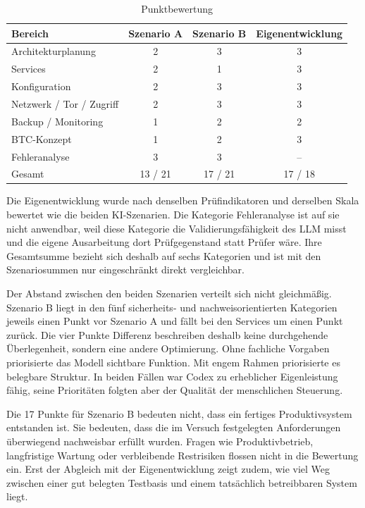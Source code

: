 {\begin{table}[h]
\centering
\begin{tabular}{lccc}
\hline
Bereich & Szenario A & Szenario B & Eigenentwicklung \\
\hline
Architekturplanung & 2 & 3 & 3 \\
Services & 2 & 1 & 3 \\
Konfiguration & 2 & 3 & 3 \\
Netzwerk / Tor / Zugriff & 2 & 3 & 3 \\
Backup / Monitoring & 1 & 2 & 2 \\
\ac{BTC}-Konzept & 1 & 2 & 3 \\
Fehleranalyse & 3 & 3 & -- \\
\hline
Gesamt & 13 / 21 & 17 / 21 & 17 / 18 \\
\hline
\end{tabular}
\caption{Punktbewertung}
\label{tab:ki-evaluation-szenarien}
\end{table}


Die Eigenentwicklung wurde nach denselben Prüfindikatoren und derselben Skala bewertet wie die beiden \ac{KI}-Szenarien. Die Kategorie Fehleranalyse ist auf sie nicht anwendbar, weil diese Kategorie die Validierungsfähigkeit des \ac{LLM} misst und die eigene Ausarbeitung dort Prüfgegenstand statt Prüfer wäre. Ihre Gesamtsumme bezieht sich deshalb auf sechs Kategorien und ist mit den Szenariosummen nur eingeschränkt direkt vergleichbar.

Der Abstand zwischen den beiden Szenarien verteilt sich nicht gleichmäßig.
Szenario B liegt in den fünf sicherheits- und nachweisorientierten Kategorien jeweils einen Punkt vor Szenario A und fällt bei den Services um einen Punkt zurück. 
Die vier Punkte Differenz beschreiben deshalb keine durchgehende Überlegenheit, sondern eine andere Optimierung. 
Ohne fachliche Vorgaben priorisierte das Modell sichtbare Funktion. Mit engem Rahmen priorisierte es belegbare Struktur. 
In beiden Fällen war Codex zu erheblicher Eigenleistung
fähig, seine Prioritäten folgten aber der Qualität der menschlichen Steuerung.

Die 17 Punkte für Szenario B bedeuten nicht, dass ein fertiges Produktivsystem entstanden ist. Sie bedeuten, dass die im Versuch festgelegten Anforderungen überwiegend nachweisbar erfüllt wurden. 
Fragen wie Produktivbetrieb, langfristige Wartung oder verbleibende Restrisiken flossen nicht in die Bewertung ein. 
Erst der Abgleich mit der Eigenentwicklung zeigt zudem, wie viel Weg zwischen einer gut belegten Testbasis und einem tatsächlich betreibbaren System liegt.

}
